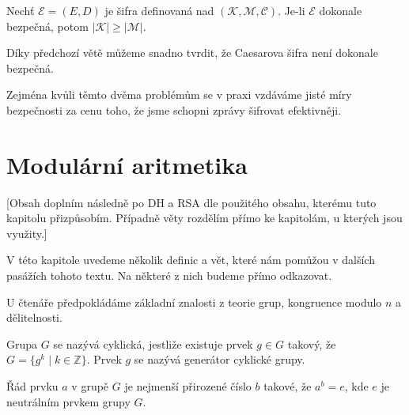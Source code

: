 \documentclass[
  program=infoi,
  biblatex,
  figures=false,
  glossaries,
  index
]{kidiplom}
\begin{document}
    \begin{theorem}
        
        Nechť $\mathcal{E}  = (E, D)$ je šifra definovaná nad $(\mathcal{K},\mathcal{M},\mathcal{C})$.
        Je-li $\mathcal{E}$ dokonale bezpečná, potom $|\mathcal{K}| \geq |\mathcal{M}|$.
    \end{theorem}


    \medskip

    Díky předchozí větě můžeme snadno tvrdit, že Caesarova šifra není dokonale bezpečná.

    Zejména kvůli těmto dvěma problémům se v praxi vzdáváme jisté míry bezpečnosti za cenu toho, že jsme schopni zprávy šifrovat efektivněji.


\section{Modulární aritmetika}\label{sec:modular-arithmetic}

    [Obsah doplním následně po DH a RSA dle použitého obsahu, kterému tuto kapitolu přizpůsobím.
    Případně věty rozdělím přímo ke kapitolám, u kterých jsou využity.]

    V této kapitole uvedeme několik definic a vět, které nám pomůžou v dalších pasážích tohoto textu.
    Na některé z nich budeme přímo odkazovat.
    
    U čtenáře předpokládáme základní znalosti z teorie grup, kongruence modulo $n$ a dělitelnosti.

    




    \begin{definition}
        Grupa $G$ se nazývá cyklická, jestliže existuje prvek $g \in G$ takový, že $G =\{g^k \mid k \in \mathbb{Z}\}$.
        Prvek $g$ se nazývá generátor cyklické grupy.
    \end{definition}

    \begin{definition}
        Řád prvku $a$ v grupě $G$ je nejmenší přirozené číslo $b$ takové, že $a^b = e$, kde $e$ je neutrálním prvkem grupy $G$.
    \end{definition}
\end{document}
